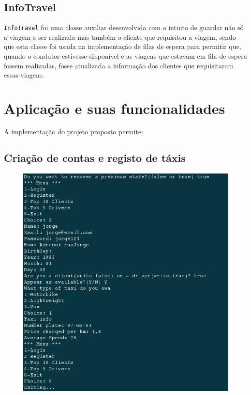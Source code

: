 \documentclass[a4paper,10pt,portuguese]{article}
\begin{document}
\subsection{InfoTravel}
\label{InfoTravel}
\texttt{InfoTravel} foi uma classe auxiliar desenvolvida com o intuito de guardar não só a viagem a ser realizada mas também o cliente que requisitou a viagem, sendo que esta classe foi usada na implementação de filas de espera para permitir que, quando o condutor estivesse disponível e as viagens que estavam em fila de espera fossem realizadas, fosse atualizada a informação dos clientes que requisitaram essas viagens.

\section{Aplicação e suas funcionalidades}
A implementação do projeto proposto permite:


\subsection{Criação de contas e registo de táxis}
\begin{figure}[H]
    \centering
    \includegraphics[width=120mm]{registarDriver.png}
\end{figure}
\end{document}
